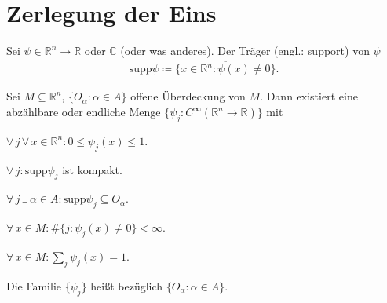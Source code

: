 %

\section{Zerlegung der Eins}
\addtocounter{thmn}{1}
\setcounter{theorem}{0}


\begin{theorem}[Definition] \label{thm:10.1}
  Sei $\psi \in \mathbb{R}^n \to \mathbb{R}$ oder $\mathbb{C}$ (oder was anderes). Der Träger (engl.: support) von $\psi$
  \begin{align*}
    \mathrm{supp} \psi \coloneq \overline{\{ x \in \mathbb{R}^n : \psi(x) \neq 0 \}}.
  \end{align*}
\end{theorem}

\begin{theorem}[Satz] \label{thm:10.2}
  Sei $M \subseteq \mathbb{R}^n$, $\{ O_\alpha : \alpha \in A \}$ offene Überdeckung von $M$. Dann existiert eine abzählbare oder endliche Menge $\{ \psi_j : C^\infty(\mathbb{R}^n \to \mathbb{R}) \}$ mit
  \begin{enum-roman}
    \item \label{itm:10.2 i} $\forall \, j \, \forall \, x \in \mathbb{R}^n : 0 \leq \psi_j(x) \leq 1$.
    
    \item \label{itm:10.2 ii} $\forall \, j : \mathrm{supp} \psi_j$ ist kompakt.
    
    \item \label{itm:10.2 iii} $\forall \, j \, \exists \, \alpha \in A : \mathrm{supp} \psi_j \subseteq O_\alpha$.
    
    \item \label{itm:10.2 iv} $\forall \, x \in M : \# \{ j : \psi_j(x) \neq 0 \} < \infty$.
    
    \item \label{itm:10.2 v} $\forall \, x \in M : \sum\limits_{j} \psi_j(x) = 1$.
  \end{enum-roman}
  Die Familie $\{ \psi_j \}$ heißt  bezüglich $\{ O_\alpha : \alpha \in A \}$.
\end{theorem}

